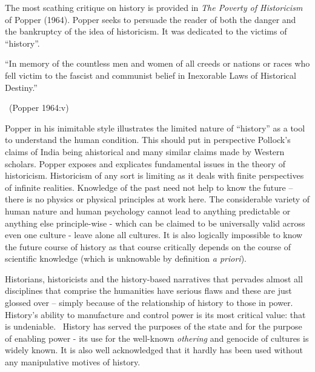 The most scathing critique on history is provided in \textit{The Poverty of Historicism} of Popper (1964). Popper seeks to persuade the reader of both the danger and the bankruptcy of the idea of historicism. It was dedicated to the victims of “history”.

\newpage

\begin{myquote}
“In memory of the countless men and women of all creeds or nations or races who fell victim to the fascist and communist belief in Inexorable Laws of Historical Destiny.”

~\hfill (Popper 1964:v)
\end{myquote}

Popper in his inimitable style illustrates the limited nature of “history” as a tool to understand the human condition. This should put in perspective Pollock’s claims of India being ahistorical and many similar claims made by Western scholars. Popper exposes and explicates fundamental issues in the theory of historicism. Historicism of any sort is limiting as it deals with finite perspectives of infinite realities. Knowledge of the past need not help to know the future – there is no physics or physical principles at work here. The considerable variety of human nature and human psychology cannot lead to anything predictable or anything else principle-wise - which can be claimed to be universally valid across even one culture - leave alone all cultures. It is also logically impossible to know the future course of history as that course critically depends on the course of scientific knowledge (which is unknowable by definition \textit{a priori}).

Historians, historicists and the history-based narratives that pervades almost all disciplines that comprise the humanities have serious flaws and these are just glossed over – simply because of the relationship of history to those in power. History’s ability to manufacture and control power is its most critical value: that is undeniable.  History has served the purposes of the state and for the purpose of enabling power - its use for the well-known \textit{othering} and genocide of cultures is widely known. It is also well acknowledged that it hardly has been used without any manipulative motives of history.


